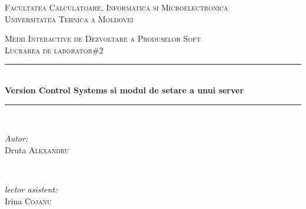 \begin{titlepage}


  \begin{center} 

  \textsc{\large Facultatea Calculatoare, Informatica si Microelectronica}\\[0.5cm]
  \textsc{\large Universitatea Tehnica a Moldovei}\\[1.2cm] 
  \vspace{25 mm}

  \textsc{\Large Medii Interactive de Dezvoltare a Produselor Soft}\\[0.5cm] 
  \textsc{\large Lucrarea de laborator\#2}\\[0.5cm]
  
\newcommand{\HRule}{\rule{\linewidth}{0.5mm}} 

  \vspace{10 mm}
  \HRule \\[0.4cm]
  { \LARGE \bfseries Version Control Systems si modul de setare a unui server  }\\[0.4cm] 
  \HRule \\[1.5cm]

      \vspace{30mm}

      \begin{minipage}{0.4\textwidth}
      \begin{flushleft} \large
      \emph{Autor:}\\
      Druta \textsc{Alexandru}
      \end{flushleft}
      \end{minipage}
      ~
      \begin{minipage}{0.4\textwidth}
      \begin{flushright} \large
      \emph{lector asistent:} \\
      Irina \textsc{Cojanu} \\  
      
      \end{flushright}
      \end{minipage}\\[4cm]

      \vspace{5 mm}
     
      \vfill
      \end{center}
      
\end{titlepage}